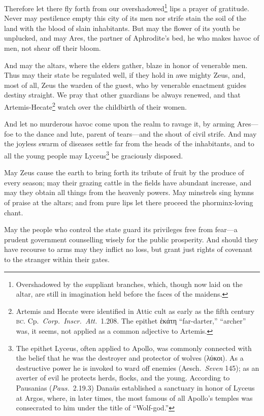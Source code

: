 \documentclass[12pt]{article}
\begin{document}
Therefore let there fly forth from our overshadowed\footnote{Overshadowed by the suppliant branches, which, though now laid on the altar, are still in imagination held before the faces of the maidens.} lips a prayer of gratitude. Never may pestilence empty this city of its men nor strife stain the soil of the land with the blood of slain inhabitants. But may the flower of its youth be unplucked, and may Ares, the partner of Aphrodite's bed, he who makes havoc of men, not shear off their bloom.

And may the altars, where the elders gather, blaze in honor of venerable men. Thus may their state be regulated well, if they hold in awe mighty Zeus, and, most of all, Zeus the warden of the guest, who by venerable enactment guides destiny straight. We pray that other guardians be always renewed, and that Artemis-Hecate\footnote{Artemis and Hecate were identified in Attic cult as early as the fifth century \textsc{bc}. Cp.~\textit{Corp.~Inscr.~Att.}~1.208. The epithet ἑκάτη ``far-darter,'' ``archer'' was, it seems, not applied as a common adjective to Artemis.} watch over the childbirth of their women.

And let no murderous havoc come upon the realm to ravage it, by arming Ares---foe to the dance and lute, parent of tears---and the shout of civil strife. And may the joyless swarm of diseases settle far from the heads of the inhabitants, and to all the young people may Lyceus\footnote{The epithet Lyceus, often applied to Apollo, was commonly connected with the belief that he was the destroyer and protector of wolves (λύκοι). As a destructive power he is invoked to ward off enemies (Aesch.~\textit{Seven} 145); as an averter of evil he protects herds, flocks, and the young. According to Pausanias (\textit{Paus.}~2.19.3) Dana\"{u}s established a sanctuary in honor of Lyceus at Argos, where, in later times, the most famous of all Apollo's temples was consecrated to him under the title of ``Wolf-god.''} be graciously disposed.

May Zeus cause the earth to bring forth its tribute of fruit by the produce of every season; may their grazing cattle in the fields have abundant increase, and may they obtain all things from the heavenly powers. May minstrels sing hymns of praise at the altars; and from pure lips let there proceed the phorminx-loving chant.

May the people who control the state guard its privileges free from fear---a prudent government counselling wisely for the public prosperity. And should they have recourse to arms may they inflict no loss, but grant just rights of covenant to the stranger within their gates.
\end{document}
